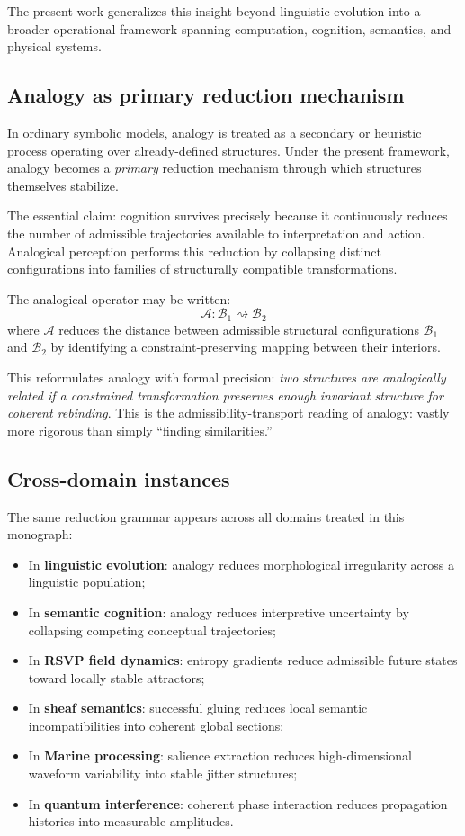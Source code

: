 \documentclass[12pt, a4paper]{article}
\theoremstyle{plain}
\theoremstyle{definition}
\theoremstyle{remark}
\newcommand{\Bcal}{\mathcal{B}}
\begin{document}
The present work generalizes this insight beyond linguistic evolution
into a broader operational framework spanning computation, cognition,
semantics, and physical systems.

\subsection{Analogy as primary reduction mechanism}

In ordinary symbolic models, analogy is treated as a secondary or
heuristic process operating over already-defined structures.
Under the present framework, analogy becomes a \emph{primary} reduction
mechanism through which structures themselves stabilize.

The essential claim:
cognition survives precisely because it continuously reduces the number
of admissible trajectories available to interpretation and action.
Analogical perception performs this reduction by collapsing distinct
configurations into families of structurally compatible transformations.

The analogical operator may be written:
\[
  \mathcal{A} : \Bcal_1 \rightsquigarrow \Bcal_2
\]
where $\mathcal{A}$ reduces the distance between admissible structural
configurations $\Bcal_1$ and $\Bcal_2$ by identifying a
constraint-preserving mapping between their interiors.

This reformulates analogy with formal precision:
\emph{two structures are analogically related if a constrained
transformation preserves enough invariant structure for coherent
rebinding}.
This is the admissibility-transport reading of analogy:
vastly more rigorous than simply ``finding similarities.''

\subsection{Cross-domain instances}

The same reduction grammar appears across all domains treated in this
monograph:
\begin{itemize}
  \item In \textbf{linguistic evolution}: analogy reduces morphological
        irregularity across a linguistic population;
  \item In \textbf{semantic cognition}: analogy reduces interpretive
        uncertainty by collapsing competing conceptual trajectories;
  \item In \textbf{RSVP field dynamics}: entropy gradients reduce
        admissible future states toward locally stable attractors;
  \item In \textbf{sheaf semantics}: successful gluing reduces local
        semantic incompatibilities into coherent global sections;
  \item In \textbf{Marine processing}: salience extraction reduces
        high-dimensional waveform variability into stable jitter
        structures;
  \item In \textbf{quantum interference}: coherent phase interaction
        reduces propagation histories into measurable amplitudes.
\end{itemize}
\end{document}
